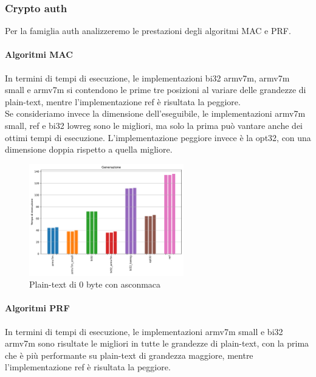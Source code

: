 \documentclass[12pt,a4paper,italian]{report}
\begin{document}
\subsubsection{Crypto auth}

Per la famiglia auth analizzeremo le prestazioni degli algoritmi MAC e PRF.

\paragraph{Algoritmi MAC}

In termini di tempi di esecuzione, le implementazioni bi32 armv7m, armv7m small e armv7m si contendono le prime tre posizioni al variare delle grandezze di plain-text, mentre l'implementazione ref è risultata la peggiore. \\

\noindent Se consideriamo invece la dimensione dell'eseguibile, le implementazioni armv7m small, ref e bi32 lowreg sono le migliori, ma solo la prima può vantare anche dei ottimi tempi di esecuzione. L'implementazione peggiore invece è la opt32, con una dimensione doppia rispetto a quella migliore.

\begin{figure}[H]
    \centering
    \includegraphics[width=0.6\textwidth]{arduino/asconmaca.pdf}
    \caption{Plain-text di 0 byte con asconmaca}
\end{figure}

\paragraph{Algoritmi PRF}

In termini di tempi di esecuzione, le implementazioni armv7m small e bi32 armv7m sono risultate le migliori in tutte le grandezze di plain-text, con la prima che è più performante su plain-text di grandezza maggiore, mentre l'implementazione ref è risultata la peggiore. \\
\end{document}
